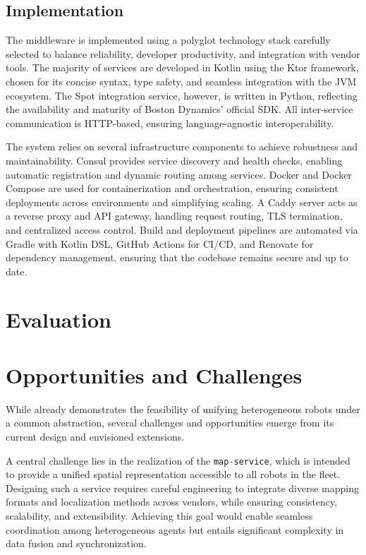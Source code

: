 \documentclass[conference]{IEEEtran}
\begin{document}
\subsection{Implementation}
The middleware is implemented using a polyglot technology stack carefully selected to 
 balance reliability, developer productivity, and integration with vendor tools. 
% 
The majority of services are developed in Kotlin using the Ktor framework, 
 chosen for its concise syntax, type safety, and seamless integration with the JVM ecosystem. 
% 
The Spot integration service, however, is written in Python, reflecting the availability 
 and maturity of Boston Dynamics' official SDK. 
% 
All inter-service communication is HTTP-based, ensuring language-agnostic interoperability.

The system relies on several infrastructure components to achieve robustness and maintainability. 
%
Consul provides service discovery and health checks, 
 enabling automatic registration and dynamic routing among services. 
% 
Docker and Docker Compose are used for containerization and orchestration, 
 ensuring consistent deployments across environments and simplifying scaling. 
% 
A Caddy server acts as a reverse proxy and API gateway, 
 handling request routing, TLS termination, and centralized access control. 
% 
Build and deployment pipelines are automated via Gradle with Kotlin DSL, GitHub Actions for CI/CD, 
 and Renovate for dependency management, ensuring that the codebase remains secure and up to date.


\section{Evaluation}\label{sec:eval}
\clearpage

\section{Opportunities and Challenges}\label{sec:impact}

While \approach{} already demonstrates the feasibility of unifying 
 heterogeneous robots under a common abstraction, 
 several challenges and opportunities emerge from its current design and envisioned extensions.

A central challenge lies in the realization of the \texttt{map-service}, 
 which is intended to provide a unified spatial representation accessible to all robots in the fleet. 
% 
Designing such a service requires careful engineering to integrate diverse mapping formats 
 and localization methods across vendors, while ensuring consistency, scalability, and extensibility. 
% 
Achieving this goal would enable seamless coordination among heterogeneous agents 
 but entails significant complexity in data fusion and synchronization.
\end{document}
